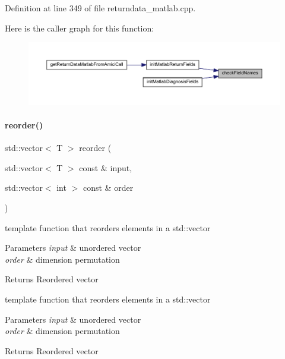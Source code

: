 Definition at line 349 of file returndata\+\_\+matlab.\+cpp.

Here is the caller graph for this function\+:
\nopagebreak
\begin{figure}[H]
\begin{center}
\leavevmode
\includegraphics[width=350pt]{namespaceamici_ad34a0a8f0a3d44e86371a2ecb5841c09_icgraph}
\end{center}
\end{figure}
\mbox{\label{namespaceamici_a34977c9aa241ea37421d94946baa77d2}} 
\paragraph{\texorpdfstring{reorder()}{reorder()}}
{\footnotesize\ttfamily std\+::vector$<$ T $>$ reorder (\begin{DoxyParamCaption}\item[{std\+::vector$<$ T $>$ const \&}]{input,  }\item[{std\+::vector$<$ int $>$ const \&}]{order }\end{DoxyParamCaption})}

template function that reorders elements in a std\+::vector


\begin{DoxyParams}{Parameters}
{\em input} & unordered vector \\
\hline
{\em order} & dimension permutation\\
\hline
\end{DoxyParams}
\begin{DoxyReturn}{Returns}
Reordered vector
\end{DoxyReturn}
template function that reorders elements in a std\+::vector


\begin{DoxyParams}{Parameters}
{\em input} & unordered vector \\
\hline
{\em order} & dimension permutation\\
\hline
\end{DoxyParams}
\begin{DoxyReturn}{Returns}
Reordered vector
\end{DoxyReturn}


